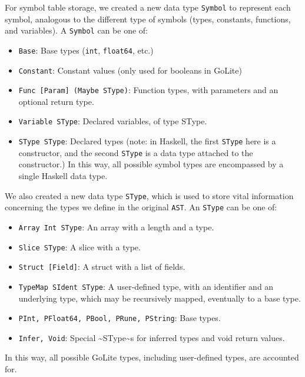 \documentclass[11pt]{article}
\begin{document}
For symbol table storage, we created a new data type \texttt{Symbol} to
represent each symbol, analogous to the different type of symbols
(types, constants, functions, and variables). A \texttt{Symbol} can be one
of:
\begin{itemize}
\item \texttt{Base}: Base types (\texttt{int}, \texttt{float64}, etc.)
\item \texttt{Constant}: Constant values (only used for booleans in GoLite)
\item \texttt{Func [Param] (Maybe SType)}: Function types, with parameters and an
optional return type.
\item \texttt{Variable SType}: Declared variables, of type SType.
\item \texttt{SType SType}: Declared types (note: in Haskell, the first \texttt{SType} here is
a constructor, and the second \texttt{SType} is a data type attached to
the constructor.)  In this way, all possible symbol types are
encompassed by a single Haskell data type.
\end{itemize}

We also created a new data type \texttt{SType}, which is used to store
vital information concerning the types we define in the original
\texttt{AST}.  An \texttt{SType} can be one of:
\begin{itemize}
\item \texttt{Array Int SType}: An array with a length and a type.
\item \texttt{Slice SType}: A slice with a type.
\item \texttt{Struct [Field]}: A struct with a list of fields.
\item \texttt{TypeMap SIdent SType}: A user-defined type, with an identifier and an
underlying type, which may be recursively mapped, eventually to a
base type.
\item \texttt{PInt, PFloat64, PBool, PRune, PString}: Base types.
\item \texttt{Infer, Void}: Special \textasciitilde{}SType\textasciitilde{}s for inferred types and void return values.
\end{itemize}
In this way, all possible GoLite types, including user-defined
types, are accounted for.
\end{document}
